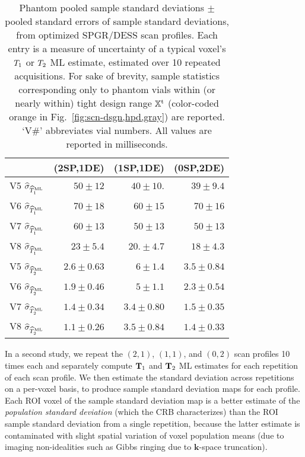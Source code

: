 \begin{table*} [!tb]
	\centering
	\begin{tabu} {c | r r r}
		\hline \hline
		 								& (2SP,1DE)				& (1SP,1DE) 			& (0SP,2DE)	\\
		\hline
		V5 $\widehat{\sigma}_{\widehat{T}_1^\mathrm{ML}}$ 	& $50 \pm 12$			& $40 \pm 10.$    & $39 \pm 9.4$ \\	
		V6 $\widehat{\sigma}_{\widehat{T}_1^\mathrm{ML}}$ 	& $70 \pm 18$ 		& $60 \pm 15$ 		& $70 \pm 16$ \\
		V7 $\widehat{\sigma}_{\widehat{T}_1^\mathrm{ML}}$ 	& $60 \pm 13$ 		& $50 \pm 13$ 		& $50 \pm 13$ \\
		V8 $\widehat{\sigma}_{\widehat{T}_1^\mathrm{ML}}$ 	& $23 \pm 5.4$ 		& $20. \pm 4.7$		& $18 \pm 4.3$ \\
		\hline \hline
		V5 $\widehat{\sigma}_{\widehat{T}_2^\mathrm{ML}}$ 	& $2.6 \pm 0.63$	& $6 \pm 1.4$			& $3.5 \pm 0.84$ \\
		V6 $\widehat{\sigma}_{\widehat{T}_2^\mathrm{ML}}$		& $1.9 \pm 0.46$ 	& $5 \pm 1.1$			& $2.3 \pm 0.54$ \\
		V7 $\widehat{\sigma}_{\widehat{T}_2^\mathrm{ML}}$ 	& $1.4 \pm 0.34$	& $3.4 \pm 0.80$ 	& $1.5 \pm 0.35$ \\
		V8 $\widehat{\sigma}_{\widehat{T}_2^\mathrm{ML}}$ 	& $1.1 \pm 0.26$	& $3.5 \pm 0.84$ 	& $1.4 \pm 0.33$ \\
		\hline \hline
	\end{tabu}
	\caption{
		Phantom pooled sample standard deviations 
		$\pm$ pooled standard errors of sample standard deviations, 
		from optimized SPGR/DESS scan profiles.
		Each entry is a measure of uncertainty 
		of a typical voxel's $T_1$ or $T_2$ ML estimate,
		estimated over 10 repeated acquisitions.
		For sake of brevity, 
		sample statistics corresponding only 
		to phantom vials within 
		(or nearly within) 
		tight design range $\mathbb{X}^\mathrm{t}$
		(color-coded orange in Fig.~\ref{fig:scn-dsgn,hpd,gray}) 
		are reported. 	
		`V\#' abbreviates vial numbers. 
		All values are reported in milliseconds.
	}
	\label{tab:scn-dsgn,hpd,std-dev}
\end{table*}

In a second study, 
we repeat the $(2,1)$, $(1,1)$, and $(0,2)$ scan profiles 
10 times each 
and separately compute $\mathbf{T}_1$ and $\mathbf{T}_2$ ML estimates
for each repetition of each scan profile. 
We then estimate the standard deviation across repetitions 
on a per-voxel basis, 
to produce sample standard deviation maps 
for each profile.
Each ROI voxel of the sample standard deviation map 
is a better estimate 
of the \emph{population standard deviation} 
(which the CRB characterizes) 
than the ROI sample standard deviation 
from a single repetition, 
because the latter estimate is contaminated 
with slight spatial variation 
of voxel population means 
(due to imaging non-idealities 
such as Gibbs ringing 
due to $\mathbf{k}$-space truncation).
	
